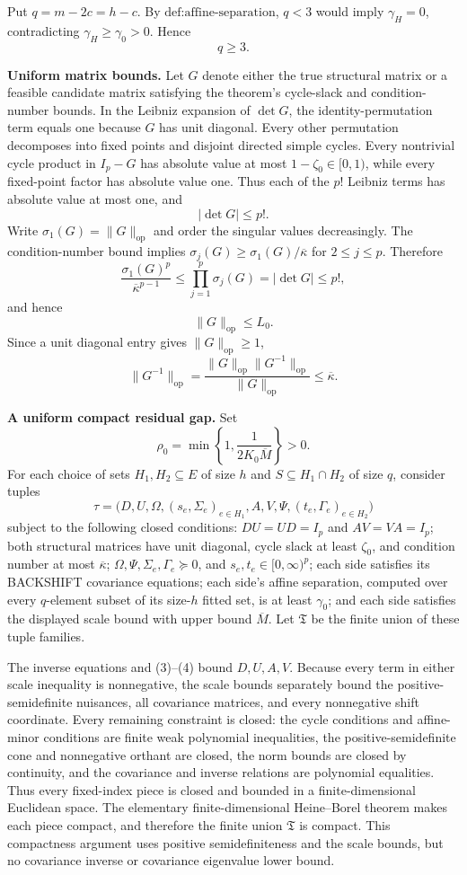 Put \(q=m-2c=h-c\). By \(\text{def:affine-separation}\), \(q<3\) would imply \(\gamma_H=0\), contradicting \(\gamma_H\geq\gamma_0>0\). Hence
\[
q\geq3.
\tag{1}
\]

\textbf{Uniform matrix bounds.}
Let \(G\) denote either the true structural matrix or a feasible candidate matrix satisfying the theorem's cycle-slack and condition-number bounds. In the Leibniz expansion of \(\det G\), the identity-permutation term equals one because \(G\) has unit diagonal. Every other permutation decomposes into fixed points and disjoint directed simple cycles. Every nontrivial cycle product in \(I_p-G\) has absolute value at most \(1-\zeta_0\in[0,1)\), while every fixed-point factor has absolute value one. Thus each of the \(p!\) Leibniz terms has absolute value at most one, and
\[
|\det G|\leq p!.
\tag{2}
\]
Write \(\sigma_1(G)=\|G\|_{\mathrm{op}}\) and order the singular values decreasingly. The condition-number bound implies \(\sigma_j(G)\geq\sigma_1(G)/\overline\kappa\) for \(2\leq j\leq p\). Therefore
\[
\frac{\sigma_1(G)^p}{\overline\kappa^{p-1}}
\leq\prod_{j=1}^p\sigma_j(G)
=|\det G|
\leq p!,
\]
and hence
\[
\|G\|_{\mathrm{op}}\leq L_0.
\tag{3}
\]
Since a unit diagonal entry gives \(\|G\|_{\mathrm{op}}\geq1\),
\[
\|G^{-1}\|_{\mathrm{op}}
=\frac{\|G\|_{\mathrm{op}}\|G^{-1}\|_{\mathrm{op}}}
{\|G\|_{\mathrm{op}}}
\leq\overline\kappa.
\tag{4}
\]

\textbf{A uniform compact residual gap.}
Set
\[
\rho_0=\min\left\{1,\frac{1}{2K_0\overline M}\right\}>0.
\tag{5}
\]
For each choice of sets \(H_1,H_2\subseteq E\) of size \(h\) and \(S\subseteq H_1\cap H_2\) of size \(q\), consider tuples
\[
\tau=\bigl(D,U,\Omega,(s_e,\Sigma_e)_{e\in H_1},
A,V,\Psi,(t_e,\Gamma_e)_{e\in H_2}\bigr)
\]
subject to the following closed conditions: \(DU=UD=I_p\) and \(AV=VA=I_p\); both structural matrices have unit diagonal, cycle slack at least \(\zeta_0\), and condition number at most \(\overline\kappa\); \(\Omega,\Psi,\Sigma_e,\Gamma_e\succeq0\), and \(s_e,t_e\in[0,\infty)^p\); each side satisfies its BACKSHIFT covariance equations; each side's affine separation, computed over every \(q\)-element subset of its size-\(h\) fitted set, is at least \(\gamma_0\); and each side satisfies the displayed scale bound with upper bound \(\overline M\). Let \(\mathfrak T\) be the finite union of these tuple families.

The inverse equations and (3)--(4) bound \(D,U,A,V\). Because every term in either scale inequality is nonnegative, the scale bounds separately bound the positive-semidefinite nuisances, all covariance matrices, and every nonnegative shift coordinate. Every remaining constraint is closed: the cycle conditions and affine-minor conditions are finite weak polynomial inequalities, the positive-semidefinite cone and nonnegative orthant are closed, the norm bounds are closed by continuity, and the covariance and inverse relations are polynomial equalities. Thus every fixed-index piece is closed and bounded in a finite-dimensional Euclidean space. The elementary finite-dimensional Heine--Borel theorem makes each piece compact, and therefore the finite union \(\mathfrak T\) is compact. This compactness argument uses positive semidefiniteness and the scale bounds, but no covariance inverse or covariance eigenvalue lower bound.

